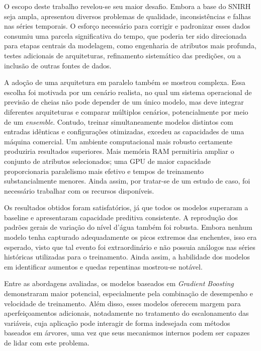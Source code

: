 O escopo deste trabalho revelou-se seu maior desafio. Embora a base do SNIRH seja ampla, apresentou diversos problemas
de qualidade, inconsistências e falhas nas séries temporais. O esforço necessário para corrigir e padronizar esses dados
consumiu uma parcela significativa do tempo, que poderia ter sido direcionada para etapas centrais da modelagem, como
engenharia de atributos mais profunda, testes adicionais de arquiteturas, refinamento sistemático das predições, ou a
inclusão de outras fontes de dados.

A adoção de uma arquitetura em paralelo também se mostrou complexa. Essa escolha foi motivada por um cenário realista,
no qual um sistema operacional de previsão de cheias não pode depender de um único modelo, mas deve integrar diferentes
arquiteturas e comparar múltiplos cenários, potencialmente por meio de um \textit{ensemble}. Contudo, treinar
simultaneamente modelos distintos com entradas idênticas e configurações otimizadas, excedeu as capacidades de uma
máquina comercial. Um ambiente computacional mais robusto certamente produziria resultados superiores. Mais memória RAM
permitiria ampliar o conjunto de atributos selecionados; uma GPU de maior capacidade proporcionaria paralelismo mais
efetivo e tempos de treinamento substancialmente menores. Ainda assim, por tratar-se de um estudo de caso, foi
necessário trabalhar com os recursos disponíveis.

Os resultados obtidos foram satisfatórios, já que todos os modelos superaram a baseline e apresentaram capacidade
preditiva consistente. A reprodução dos padrões gerais de variação do nível d'água também foi robusta. Embora nenhum
modelo tenha capturado adequadamente os picos extremos das enchentes, isso era esperado, visto que tal evento foi
extraordinário e não possuia análogos nas séries históricas utilizadas para o treinamento. Ainda assim, a habilidade dos
modelos em identificar aumentos e quedas repentinas mostrou-se notável.

Entre as abordagens avaliadas, os modelos baseados em \textit{Gradient Boosting} demonstraram maior potencial,
especialmente pela combinação de desempenho e velocidade de treinamento. Além disso, esses modelos oferecem margem para
aperfeiçoamentos adicionais, notadamente no tratamento do escalonamento das variáveis, cuja aplicação pode interagir de
forma indesejada com métodos baseados em árvores, uma vez que seus mecanismos internos podem ser capazes de lidar com
este problema.